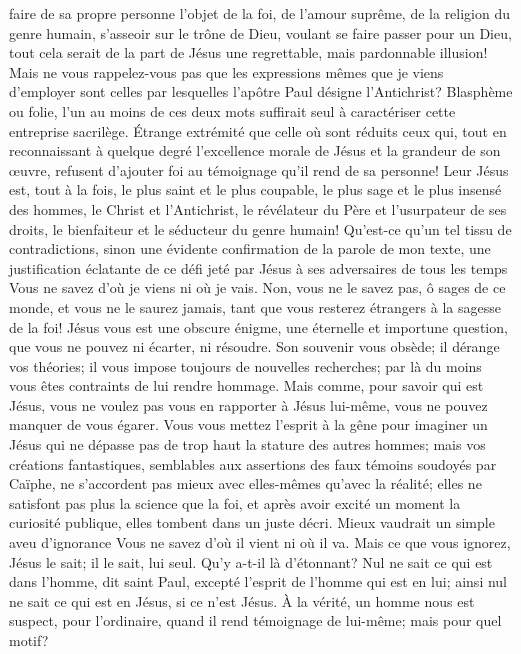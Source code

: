 faire de sa propre personne l’objet de la foi, de l’amour suprême, de la religion du genre humain,
s’asseoir sur le trône de Dieu, voulant se faire passer pour un Dieu,
tout cela serait de la part de Jésus une regrettable, mais pardonnable illusion!
Mais ne vous rappelez-vous pas que les expressions mêmes que je viens d’employer sont celles par lesquelles l’apôtre Paul désigne l’Antichrist?
Blasphème ou folie, l’un au moins de ces deux mots suffirait seul à caractériser cette entreprise sacrilège.
Étrange extrémité que celle où sont réduits ceux qui, tout en reconnaissant à quelque degré l’excellence morale de Jésus
et la grandeur de son œuvre, refusent d’ajouter foi au témoignage qu’il rend de sa personne!
Leur Jésus est, tout à la fois, le plus saint et le plus coupable,
le plus sage et le plus insensé des hommes, le Christ et l’Antichrist,
le révélateur du Père et l’usurpateur de ses droits, le bienfaiteur et le séducteur du genre humain!
Qu’est-ce qu’un tel tissu de contradictions, sinon une évidente confirmation de la parole de mon texte,
une justification éclatante de ce défi jeté par Jésus à ses adversaires de tous les temps\frcolon{}
\Og{} Vous ne savez d’où je viens ni où je vais.\Fg{}
Non, vous ne le savez pas, ô sages de ce monde, et vous ne le saurez jamais, tant que vous resterez étrangers à la sagesse de la foi!
Jésus vous est une obscure énigme, une éternelle et importune question, que vous ne pouvez ni écarter, ni résoudre.
Son souvenir vous obsède; il dérange vos théories; il vous impose toujours de nouvelles recherches;
par là du moins vous êtes contraints de lui rendre hommage.
Mais comme, pour savoir qui est Jésus, vous ne voulez pas vous en rapporter à Jésus lui-même,
vous ne pouvez manquer de vous égarer.
Vous vous mettez l’esprit à la gêne pour imaginer un Jésus qui ne dépasse pas de trop haut la stature des autres hommes;
mais vos créations fantastiques, semblables aux assertions des faux témoins soudoyés par Caïphe,
ne s’accordent pas mieux avec elles-mêmes qu’avec la réalité; elles ne satisfont pas plus la science que la foi,
et après avoir excité un moment la curiosité publique, elles tombent dans un juste décri.
Mieux vaudrait un simple aveu d’ignorance\frcolon{}
Vous ne savez d’où il vient ni où il va. Mais ce que vous ignorez, Jésus le sait; il le sait, lui seul.
Qu’y a-t-il là d’étonnant?
\Og{} Nul ne sait ce qui est dans l’homme, dit saint Paul, excepté l’esprit de l’homme qui est en lui\Fg{};
ainsi nul ne sait ce qui est en Jésus, si ce n’est Jésus.
À la vérité, un homme nous est suspect, pour l’ordinaire, quand il rend témoignage de lui-même; mais pour quel motif?
